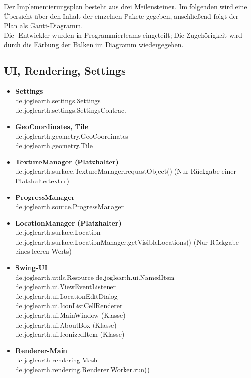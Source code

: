 \documentclass[10pt]{scrreprt}
\newcommand{\JoglEarth}{\raisebox{-1.2mm}{\texttt{[image: Logo-Text.eps]}} }
\begin{document}
Der Implementierungsplan besteht aus drei Meilensteinen. Im folgenden wird eine Übersicht über den Inhalt der einzelnen Pakete gegeben, anschließend folgt der Plan als Gantt-Diagramm.\\[3mm]
Die \JoglEarth -Entwickler wurden in Programmierteams eingeteilt; Die Zugehörigkeit wird durch die Färbung der Balken im Diagramm wiedergegeben.

\subsection*{UI, Rendering, Settings}
\begin{itemize}
\item \textbf{Settings}\\
de.joglearth.settings.Settings\\
de.joglearth.settings.SettingsContract
\item \textbf{GeoCoordinates, Tile}\\
de.joglearth.geometry.GeoCoordinates\\
de.joglearth.geometry.Tile
\item \textbf{TextureManager (Platzhalter)}\\
de.joglearth.surface.TextureManager.requestObject() (Nur Rückgabe einer Platzhaltertextur)
\item \textbf{ProgressManager}\\
de.joglearth.source.ProgressManager
\item \textbf{LocationManager (Platzhalter)}\\
de.joglearth.surface.Location\\
de.joglearth.surface.LocationManager.getVisibleLocations() (Nur Rückgabe eines leeren Werts)
\item \textbf{Swing-UI}\\
de.joglearth.utils.Resource
de.joglearth.ui.NamedItem\\
de.joglearth.ui.ViewEventListener\\
de.joglearth.ui.LocationEditDialog\\
de.joglearth.ui.IconListCellRenderer\\
de.joglearth.ui.MainWindow (Klasse)\\
de.joglearth.ui.AboutBox (Klasse)\\
de.joglearth.ui.IconizedItem (Klasse)
\item \textbf{Renderer-Main}\\
de.joglearth.rendering.Mesh\\
de.joglearth.rendering.Renderer.Worker.run() 

\end{itemize}
\end{document}
